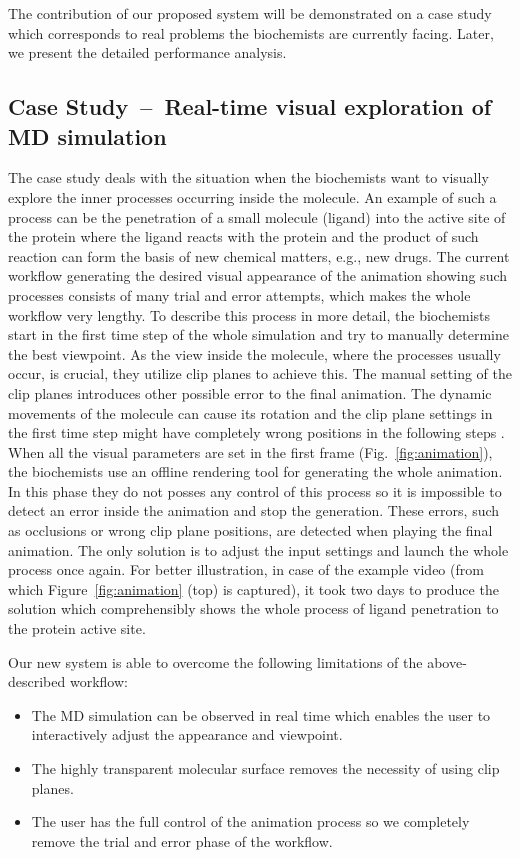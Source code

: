 The contribution of our proposed system will be demonstrated on a case study which corresponds to real problems the biochemists are currently facing. 
Later, we present the detailed performance analysis.

\subsection{Case Study~--~Real-time visual exploration of MD simulation}
The case study deals with the situation when the biochemists want to visually explore the inner processes occurring inside the molecule. 
An example of such a process can be the penetration of a small molecule (ligand) into the active site of the protein where the ligand reacts with the protein and the product of such reaction can form the basis of new chemical matters, e.g., new drugs. 
The current workflow generating the desired visual appearance of the animation showing such processes consists of many trial and error attempts, which makes the whole workflow very lengthy. 
To describe this process in more detail, the biochemists start in the first time step of the whole simulation and try to manually determine the best viewpoint.
As the view inside the molecule, where the processes usually occur, is crucial, they utilize clip planes to achieve this.
The manual setting of the clip planes introduces other possible error to the final animation.
The dynamic movements of the molecule can cause its rotation and the clip plane settings in the first time step might have completely wrong positions in the following steps .
When all the visual parameters are set in the first frame (Fig.~\ref{fig:animation}), the biochemists use an offline rendering tool for generating the whole animation.
In this phase they do not posses any control of this process so it is impossible to detect an error inside the animation and stop the generation.
These errors, such as occlusions or wrong clip plane positions, are detected when playing the final animation.
The only solution is to adjust the input settings and launch the whole process once again.
For better illustration, in case of the example video (from which Figure~\ref{fig:animation} (top) is captured), it took two days to produce the solution which comprehensibly shows the whole process of ligand penetration to the protein active site.

Our new system is able to overcome the following limitations of the above-described workflow:
\begin{itemize} 
\item The MD simulation can be observed in real time which enables the user to interactively adjust the appearance and viewpoint.
\item The highly transparent molecular surface removes the necessity of using clip planes.
\item The user has the full control of the animation process so we completely remove the trial and error phase of the workflow. 
\end{itemize}

